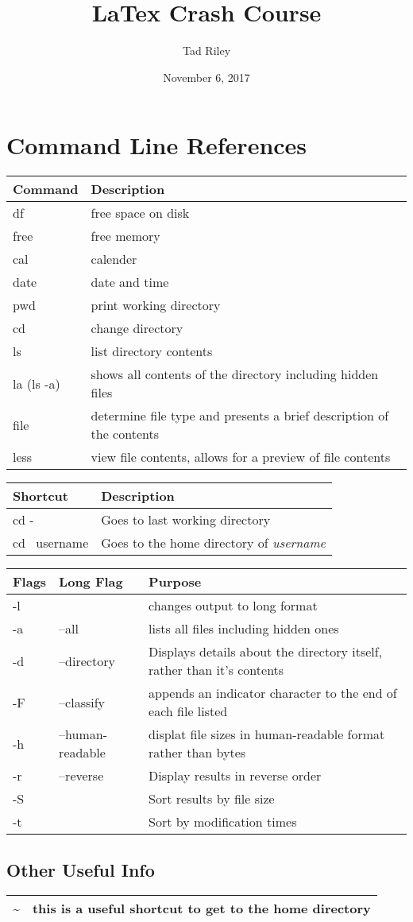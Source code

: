 \documentclass[12pt]{article}
\title{LaTex Crash Course}
\author{Tad Riley}
\date{November 6, 2017}
\begin{document}
\newpage
\section{Command Line References}%
\begin{tabular}{| l | l |}
	\hline
	Command & Description\\ \hline
	df & free space on disk\\
	free & free memory\\
	cal & calender\\
	date & date and time\\
	pwd & print working directory\\
	cd & change directory\\
	ls & list directory contents\\
	la (ls -a)& shows all contents of the directory including hidden files\\
	file & determine file type and presents a brief description of the contents\\
	less & view file contents, allows for a preview of file contents\\
	\hline

\end{tabular}

\bigskip

\begin{tabular}{| l | l |}
	\hline
	Shortcut & Description\\ \hline
	cd - & Goes to last working directory\\
	cd ~username & Goes to the home directory of \textit{username}\\
	\hline
\end{tabular}

\bigskip

\begin{tabular}{| l | l | l |}
	\hline
	Flags & Long Flag &Purpose\\ \hline
	-l & &changes output to long format\\
	-a & --all & lists all files including hidden ones\\
	-d & --directory & Displays details about the directory itself, rather than it's contents\\
	-F & --classify & appends an indicator character to the end of each file listed\\
	-h & --human-readable & displat file sizes in human-readable format rather than bytes\\
	-r & --reverse & Display results in reverse order\\
	-S & & Sort results by file size\\
	-t & &Sort by modification times\\
	\hline

\end{tabular}

\subsection{Other Useful Info}
\begin{tabular}{| l | l |}
	
	\hline
	\textasciitilde & this is a useful shortcut to get to the home directory\\
	\hline

\end{tabular}
\end{document}
